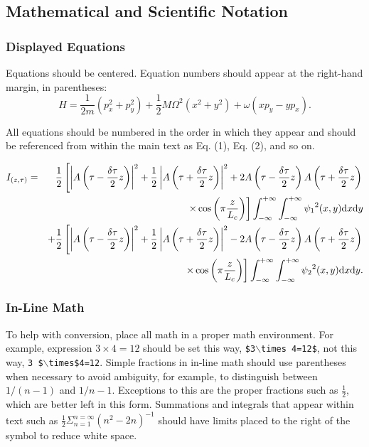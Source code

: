 \documentclass[letterpaper,11pt]{article}   %
\begin{document}
\subsection{Mathematical and Scientific Notation}
\subsubsection{Displayed Equations} Equations should be centered.
Equation numbers should appear at the right-hand margin, in
parentheses:
\begin{equation}
H = \frac{1}{2m}(p_x^2 + p_y^2) + \frac{1}{2} M{\Omega}^2
     (x^2 + y^2) + \omega (xp_y - yp_x).
\end{equation}

All equations should be numbered in the order in which they appear
and should be referenced  from within the main text as Eq. (1),
Eq. (2), and so on.

\begin{eqnarray}
I_{(z, \tau)} & = & \frac{1}{2} \left[ \left|
             A \left(\tau - \frac{\delta \tau}{2}z \right) \right|^2
           + \frac{1}{2} \left| A \left( \tau + \frac{\delta \tau}{2}z \right) \right|^2
           + 2A \left( \tau - \frac{\delta \tau}{2}z \right)
             A \left( \tau + \frac{\delta \tau}{2}z \right) \right. \nonumber \\
     & & \left. \times \cos \left( \pi \frac{z}{L_c} \right) \right]
             \int _{-\infty}^{+\infty}\int _{-\infty}^{+\infty}
             {\psi_1}^2(x,y){\rm d}x{\rm d}y  \nonumber \\
     & & + \frac{1}{2} \left[ \left| A \left(
           \tau - \frac{\delta \tau}{2}z \right) \right| ^2
           + \frac{1}{2} \left| A \left( \tau + \frac{\delta \tau}{2}z \right) \right| ^2
           - 2A \left( \tau - \frac{\delta \tau}{2}z \right)
              A \left( \tau + \frac{\delta \tau}{2}z \right) \right. \nonumber \\
     & & \left.  \times \cos \left( \pi \frac{z}{L_c} \right) \right]
           \int _{-\infty}^{+\infty}\int _{-\infty}^{+\infty}
           {\psi_2}^2(x,y){\rm d}x{\rm d}y.
\end{eqnarray}


\subsubsection{In-Line Math} To help with conversion, place all math in a proper math environment. For example, expression \mbox{$3\times 4 = 12$} should be set this way, \texttt{\$3$\backslash$times 4=12\$}, not this way, \texttt{3 \$$\backslash$times\$4=12}. Simple fractions in in-line math
should use parentheses when necessary to avoid ambiguity, for
example, to distinguish between $1/(n-1)$ and $1/n-1$.  Exceptions
to this are the proper fractions such as $\frac{1}{2}$, which are
better left in this form. Summations and integrals that appear
within text such as $\frac{1}{2}{\Sigma } _{n=1}^{n=\infty} (n^2 -
2n)^{-1}$ should have limits placed to the right of the symbol to
reduce white space.
\end{document}
